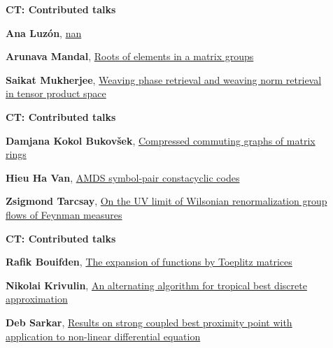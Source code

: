 \documentclass[ILAS2025-program.tex]{subfiles}
\begin{document}
\begin{description}
\begin{description}
        \end{description}
    \begin{description}
    \item[] {\color{mstitle}\textbf{CT: Contributed talks}} 
    \item[] \hypertarget{up0413}{}\textbf{Ana Luzón}, \hyperlink{down0413}{nan}
        \item[] \hypertarget{up0414}{}\textbf{Arunava Mandal}, \hyperlink{down0414}{Roots of elements in a matrix groups}
        \item[] \hypertarget{up0415}{}\textbf{Saikat Mukherjee}, \hyperlink{down0415}{Weaving phase retrieval and weaving norm retrieval in tensor product space}
        \end{description}
    \begin{description}
    \item[] {\color{mstitle}\textbf{CT: Contributed talks}} 
    \item[] \hypertarget{up0416}{}\textbf{Damjana Kokol Bukovšek}, \hyperlink{down0416}{Compressed commuting graphs of matrix rings}
        \item[] \hypertarget{up0417}{}\textbf{Hieu Ha Van}, \hyperlink{down0417}{AMDS symbol-pair constacyclic codes}
        \item[] \hypertarget{up0418}{}\textbf{Zsigmond Tarcsay}, \hyperlink{down0418}{On the UV limit of Wilsonian renormalization group flows of Feynman measures}
        \end{description}
    \begin{description}
    \item[] {\color{mstitle}\textbf{CT: Contributed talks}} 
    \item[] \hypertarget{up0419}{}\textbf{Rafik Bouifden}, \hyperlink{down0419}{The expansion of functions by Toeplitz matrices}
        \item[] \hypertarget{up0420}{}\textbf{Nikolai Krivulin}, \hyperlink{down0420}{An alternating algorithm for tropical best discrete approximation}
        \item[] \hypertarget{up0421}{}\textbf{Deb Sarkar}, \hyperlink{down0421}{Results on strong coupled best proximity point with application to non-linear differential equation}
        \end{description}

\end{description}
\end{document}
